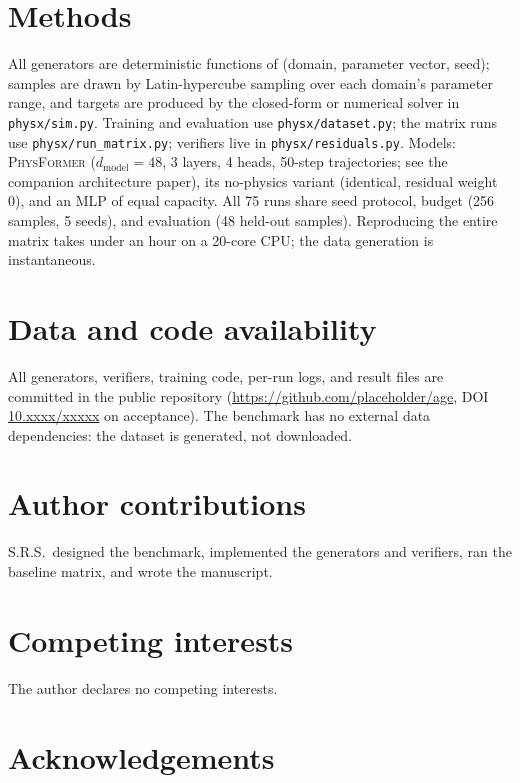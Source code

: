 \documentclass[11pt,a4paper]{article}
\begin{document}
\section{Methods}
\label{sec:methods}

All generators are deterministic functions of (domain, parameter vector,
seed); samples are drawn by Latin-hypercube sampling over each domain's
parameter range, and targets are produced by the closed-form or numerical
solver in \texttt{physx/sim.py}. Training and evaluation use
\texttt{physx/dataset.py}; the matrix runs use \texttt{physx/run\_matrix.py};
verifiers live in \texttt{physx/residuals.py}. Models: \textsc{PhysFormer}
($d_{\mathrm{model}}=48$, 3 layers, 4 heads, 50-step trajectories; see the
companion architecture paper), its no-physics variant (identical, residual
weight 0), and an MLP of equal capacity. All 75 runs share seed protocol,
budget (256 samples, 5 seeds), and evaluation (48 held-out samples).
Reproducing the entire matrix takes under an hour on a 20-core CPU; the data
generation is instantaneous.

\section*{Data and code availability}
\label{sec:dataavail}

All generators, verifiers, training code, per-run logs, and result files are
committed in the public repository (\url{https://github.com/placeholder/age},
DOI \href{https://doi.org/10.xxxx/xxxxx}{10.xxxx/xxxxx} on acceptance). The
benchmark has no external data dependencies: the dataset is generated, not
downloaded.

\section*{Author contributions}
\label{sec:author}

S.R.S.\ designed the benchmark, implemented the generators and verifiers, ran
the baseline matrix, and wrote the manuscript.

\section*{Competing interests}
\label{sec:competing}

The author declares no competing interests.

\section*{Acknowledgements}
\label{sec:ack}
\end{document}
